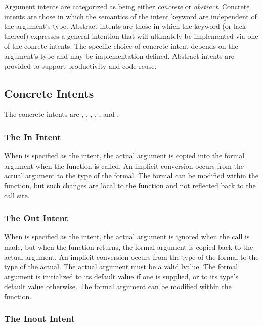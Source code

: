 Argument intents are categorized as being either \emph{concrete}
or \emph{abstract}.  Concrete intents are those in which the semantics
of the intent keyword are independent of the argument's type.
Abstract intents are those in which the keyword (or lack thereof)
expresses a general intention that will ultimately be implemented via
one of the conrete intents.  The specific choice of concrete intent
depends on the argument's type and may be implementation-defined.
Abstract intents are provided to support productivity and code reuse.

\subsection{Concrete Intents}
\label{Concrete Intents}

The concrete intents are , , ,
, , and .

\subsubsection{The In Intent}
\label{The_In_Intent}

When  is specified as the intent, the actual argument is
copied into the formal argument when the function is called.
An implicit conversion occurs from the actual argument
to the type of the formal.  The
formal can be modified within the function, but such changes are local
to the function and not reflected back to the call site.


\subsubsection{The Out Intent}
\label{The_Out_Intent}

When  is specified as the intent, the actual argument is
ignored when the call is made, but when the function returns, the
formal argument is copied back to the actual argument.
An implicit conversion occurs from the type of the formal
to the type of the actual.  The actual argument
must be a valid lvalue.  The formal
argument is initialized to its default value if one is supplied, or to
its type's default value otherwise.  The formal argument can be
modified within the function.


\subsubsection{The Inout Intent}
\label{The_Inout_Intent}

